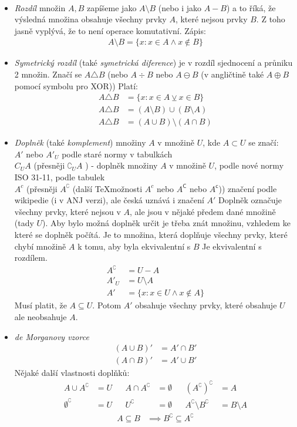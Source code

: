 \documentclass[12pt]{article}
\providecommand{\lxor}{\veebar}
\begin{document}
\begin{itemize}
\begin{align}
\end{align}
\item \emph{Rozdíl} množin $A,B$ zapíšeme jako $A \setminus B$ (nebo i jako $A -B$) a to říká, že výsledná množina obsahuje všechny prvky $A$, které nejsou prvky $B$. Z toho jasně vyplývá, že to není operace komutativní. Zápis:
\begin{align}
A \setminus B= \{ x: x \in A \land x \notin B \}
\end{align}
\item \emph{Symetrický rozdíl} (také \emph{symetrická diference}) je v rozdíl sjednocení a průniku 2 množin.  Značí se $A \triangle B$ (nebo $A \div B$ nebo $A \ominus B$ (v angličtině také $ A \oplus B$ pomocí symbolu pro XOR)) Platí:
\begin{align}
A \triangle B &= \{ x: x \in A \lxor x \in B \} \\
A \triangle B &= (A \setminus B) \cup (B \setminus A)\\
A \triangle B &= (A \cup B) \setminus (A \cap B)
\end{align}
\item \emph{Doplněk} (také \emph{komplement}) množiny $A$ v množině $U$, kde $A \subset U$ se značí:\\
$A'$ nebo $A'_{U}$ podle staré normy v tabulkách\\
$C_U A$ (přesněji $\complement_U A$ ) - doplněk množiny $A$ v množině $U$, podle nové normy ISO 31-11, podle tabulek\\
$A^c$  (přesněji $A^\complement$ (další \TeX možnosti $A^c$ nebo $A^\mathsf{C}$ nebo $A^\mathsf{c}$)) značení podle wikipedie (i v ANJ verzi), ale česká uznává i značení $A'$
Doplněk označuje všechny prvky, které nejsou v $A$, ale jsou v nějaké předem dané množině (tady $U$). Aby bylo možná doplněk určit je třeba znát množinu, vzhledem ke které se doplněk počítá. Je to množina, která doplňuje všechny prvky, které chybí množině $A$ k tomu, aby byla ekvivalentní s $B$ Je ekvivalentní s rozdílem.
\begin{align}
A^\complement &= U - A\\
A'_U &= U \setminus A \\
A' &= \{ x: x \in U \land x \notin A \}
\end{align}
Musí platit, že $A \subseteq U$. Potom $A'$ obsahuje všechny prvky, které obsahuje $U$ ale neobsahuje $A$.
\item \emph{de Morganovy vzorce}
\begin{align}
(A \cup B)' &= A' \cap B' \\
(A \cap B)' &= A' \cup B'
\end{align}
Nějaké další vlastnosti doplňků:
\begin{align*}
A \cup A^\complement &= U && A \cap A^\complement &= \emptyset && (A^\complement)^\complement &= A  \\
\emptyset^\complement &= U && U^\complement &= \emptyset && A^\complement \setminus B^\complement &= B \setminus A
\end{align*}
\begin{align*}
A \subseteq B &\implies B^\complement \subseteq A^\complement
\end{align*}


\end{itemize}
\end{document}
